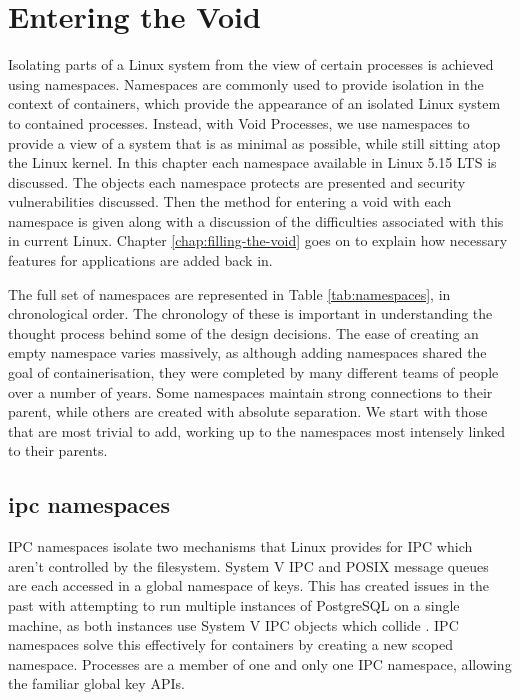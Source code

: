 \documentclass[12pt,a4paper,twoside]{report}
\begin{document}
\chapter{Entering the Void}
\label{chap:entering-the-void}

Isolating parts of a Linux system from the view of certain processes is achieved using namespaces. Namespaces are commonly used to provide isolation in the context of containers, which provide the appearance of an isolated Linux system to contained processes. Instead, with Void Processes, we use namespaces to provide a view of a system that is as minimal as possible, while still sitting atop the Linux kernel. In this chapter each namespace available in Linux 5.15 LTS is discussed. The objects each namespace protects are presented and security vulnerabilities discussed. Then the method for entering a void with each namespace is given along with a discussion of the difficulties associated with this in current Linux. Chapter \ref{chap:filling-the-void} goes on to explain how necessary features for applications are added back in.

The full set of namespaces are represented in Table \ref{tab:namespaces}, in chronological order. The chronology of these is important in understanding the thought process behind some of the design decisions. The ease of creating an empty namespace varies massively, as although adding namespaces shared the goal of containerisation, they were completed by many different teams of people over a number of years. Some namespaces maintain strong connections to their parent, while others are created with absolute separation. We start with those that are most trivial to add, working up to the namespaces most intensely linked to their parents.

\section{ipc namespaces}
\label{sec:voiding-ipc}

IPC namespaces isolate two mechanisms that Linux provides for IPC which aren't controlled by the filesystem. System V IPC and POSIX message queues are each accessed in a global namespace of keys. This has created issues in the past with attempting to run multiple instances of PostgreSQL on a single machine, as both instances use System V IPC objects which collide \citep[§4.3]{barham_xen_2003}. IPC namespaces solve this effectively for containers by creating a new scoped namespace. Processes are a member of one and only one IPC namespace, allowing the familiar global key APIs.
\end{document}

